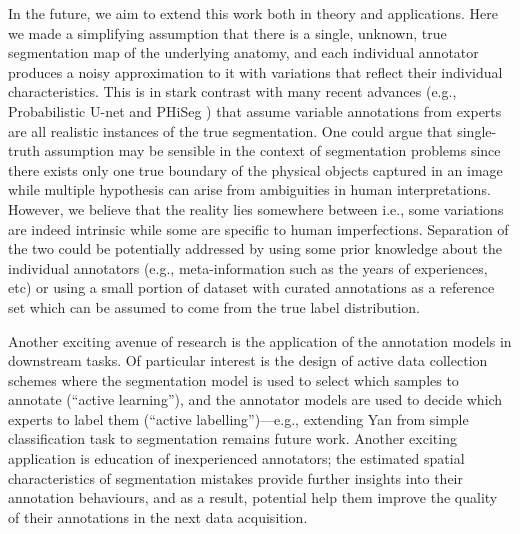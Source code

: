 In the future, we aim to extend this work both in theory and applications. Here we made a simplifying assumption that there is a single, unknown, true segmentation map of the underlying anatomy, and each individual annotator produces a noisy approximation to it with variations that reflect their individual characteristics. This is in stark contrast with many recent advances (e.g., Probabilistic U-net \cite{kohl2018probabilistic} and PHiSeg \cite{baumgartner2019phiseg}) that assume variable annotations from experts are all realistic instances of the true segmentation. One could argue that single-truth assumption may be sensible in the context of segmentation problems since there exists only one true boundary of the physical objects captured in an image while multiple hypothesis can arise from ambiguities in human interpretations. However, we believe that the reality lies somewhere between i.e., some variations are indeed intrinsic while some are specific to human imperfections. Separation of the two could be potentially addressed by using some prior knowledge about the individual annotators (e.g., meta-information such as the years of experiences, etc) \cite{raykar2009supervised} or using a small portion of dataset with curated annotations as a reference set which can be assumed to come from the true label distribution. 

Another exciting avenue of research is the application of the annotation models in downstream tasks. Of particular interest is the design of active data collection schemes where the segmentation model is used to select which samples to annotate (``active learning''), and the annotator models are used to decide which experts to label them (``active labelling'')---e.g., extending Yan \etal \cite{yan2011active} from simple classification task to segmentation remains future work. Another exciting application is education of inexperienced annotators; the estimated spatial characteristics of segmentation mistakes provide further insights into their annotation behaviours, and as a result, potential help them improve the quality of their annotations in the next data acquisition. 


